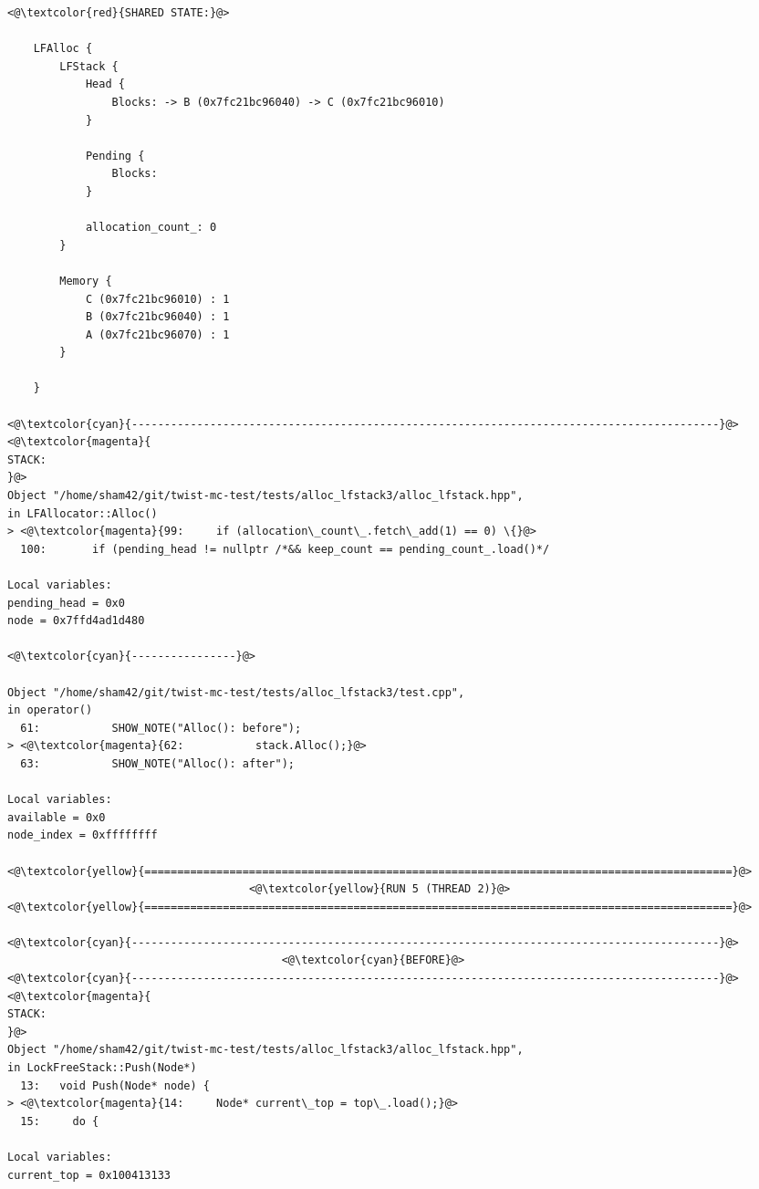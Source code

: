 \begin{adjustwidth}{-3.3cm}{-1cm}
\begin{allintypewriter}
\begin{multicols*}{2}
\begin{lstlisting}[numbers=none]
<@\textcolor{red}{SHARED STATE:}@>

    LFAlloc {
	    LFStack {
		    Head {
			    Blocks: -> B (0x7fc21bc96040) -> C (0x7fc21bc96010) 
		    }

		    Pending {
			    Blocks: 
		    }

		    allocation_count_: 0
	    }

	    Memory {
		    C (0x7fc21bc96010) : 1
		    B (0x7fc21bc96040) : 1
		    A (0x7fc21bc96070) : 1
	    }

    }

<@\textcolor{cyan}{------------------------------------------------------------------------------------------}@>
<@\textcolor{magenta}{
STACK:
}@>
Object "/home/sham42/git/twist-mc-test/tests/alloc_lfstack3/alloc_lfstack.hpp",
in LFAllocator::Alloc()
> <@\textcolor{magenta}{99:     if (allocation\_count\_.fetch\_add(1) == 0) \{}@>
  100:       if (pending_head != nullptr /*&& keep_count == pending_count_.load()*/

Local variables: 
pending_head = 0x0
node = 0x7ffd4ad1d480

<@\textcolor{cyan}{----------------}@>

Object "/home/sham42/git/twist-mc-test/tests/alloc_lfstack3/test.cpp",
in operator()
  61:           SHOW_NOTE("Alloc(): before");
> <@\textcolor{magenta}{62:           stack.Alloc();}@>
  63:           SHOW_NOTE("Alloc(): after");

Local variables: 
available = 0x0
node_index = 0xffffffff

<@\textcolor{yellow}{==========================================================================================}@>
                                     <@\textcolor{yellow}{RUN 5 (THREAD 2)}@>
<@\textcolor{yellow}{==========================================================================================}@>

<@\textcolor{cyan}{------------------------------------------------------------------------------------------}@>
                                          <@\textcolor{cyan}{BEFORE}@>
<@\textcolor{cyan}{------------------------------------------------------------------------------------------}@>
<@\textcolor{magenta}{
STACK:
}@>
Object "/home/sham42/git/twist-mc-test/tests/alloc_lfstack3/alloc_lfstack.hpp",
in LockFreeStack::Push(Node*)
  13:   void Push(Node* node) {
> <@\textcolor{magenta}{14:     Node* current\_top = top\_.load();}@>
  15:     do {

Local variables: 
current_top = 0x100413133


\end{lstlisting}
\end{multicols*}
\end{allintypewriter}
\end{adjustwidth}
